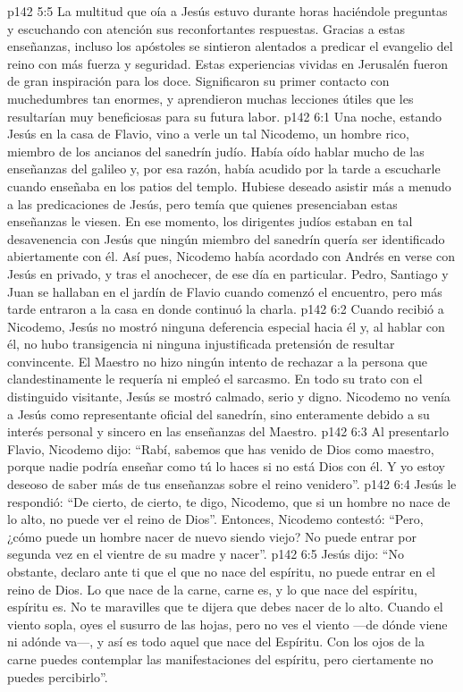\vs p142 5:5 \pc La multitud que oía a Jesús estuvo durante horas haciéndole preguntas y escuchando con atención sus reconfortantes respuestas. Gracias a estas enseñanzas, incluso los apóstoles se sintieron alentados a predicar el evangelio del reino con más fuerza y seguridad. Estas experiencias vividas en Jerusalén fueron de gran inspiración para los doce. Significaron su primer contacto con muchedumbres tan enormes, y aprendieron muchas lecciones útiles que les resultarían muy beneficiosas para su futura labor.
\vs p142 6:1 Una noche, estando Jesús en la casa de Flavio, vino a verle un tal Nicodemo, un hombre rico, miembro de los ancianos del sanedrín judío. Había oído hablar mucho de las enseñanzas del galileo y, por esa razón, había acudido por la tarde a escucharle cuando enseñaba en los patios del templo. Hubiese deseado asistir más a menudo a las predicaciones de Jesús, pero temía que quienes presenciaban estas enseñanzas le viesen. En ese momento, los dirigentes judíos estaban en tal desavenencia con Jesús que ningún miembro del sanedrín quería ser identificado abiertamente con él. Así pues, Nicodemo había acordado con Andrés en verse con Jesús en privado, y tras el anochecer, de ese día en particular. Pedro, Santiago y Juan se hallaban en el jardín de Flavio cuando comenzó el encuentro, pero más tarde entraron a la casa en donde continuó la charla.
\vs p142 6:2 Cuando recibió a Nicodemo, Jesús no mostró ninguna deferencia especial hacia él y, al hablar con él, no hubo transigencia ni ninguna injustificada pretensión de resultar convincente. El Maestro no hizo ningún intento de rechazar a la persona que clandestinamente le requería ni empleó el sarcasmo. En todo su trato con el distinguido visitante, Jesús se mostró calmado, serio y digno. Nicodemo no venía a Jesús como representante oficial del sanedrín, sino enteramente debido a su interés personal y sincero en las enseñanzas del Maestro.
\vs p142 6:3 Al presentarlo Flavio, Nicodemo dijo: “Rabí, sabemos que has venido de Dios como maestro, porque nadie podría enseñar como tú lo haces si no está Dios con él. Y yo estoy deseoso de saber más de tus enseñanzas sobre el reino venidero”.
\vs p142 6:4 Jesús le respondió: “De cierto, de cierto, te digo, Nicodemo, que si un hombre no nace de lo alto, no puede ver el reino de Dios”. Entonces, Nicodemo contestó: “Pero, ¿cómo puede un hombre nacer de nuevo siendo viejo? No puede entrar por segunda vez en el vientre de su madre y nacer”.
\vs p142 6:5 Jesús dijo: “No obstante, declaro ante ti que el que no nace del espíritu, no puede entrar en el reino de Dios. Lo que nace de la carne, carne es, y lo que nace del espíritu, espíritu es. No te maravilles que te dijera que debes nacer de lo alto. Cuando el viento sopla, oyes el susurro de las hojas, pero no ves el viento ---de dónde viene ni adónde va---, y así es todo aquel que nace del Espíritu. Con los ojos de la carne puedes contemplar las manifestaciones del espíritu, pero ciertamente no puedes percibirlo”.
